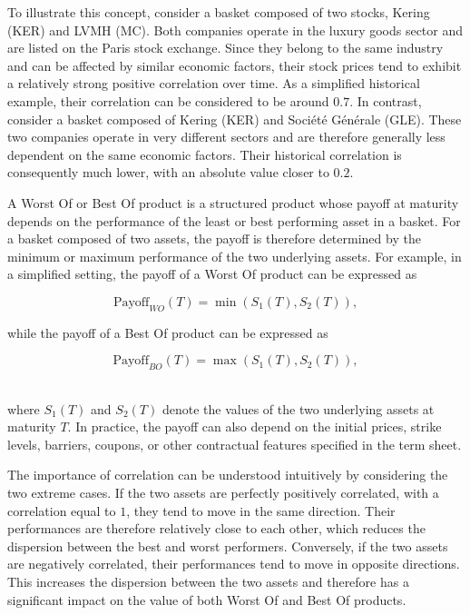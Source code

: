 \documentclass{article}
\begin{document}
To illustrate this concept, consider a basket composed of two stocks, Kering (KER) and LVMH (MC). Both companies operate in the luxury goods sector and are listed on the Paris stock exchange. Since they belong to the same industry and can be affected by similar economic factors, their stock prices tend to exhibit a relatively strong positive correlation over time. As a simplified historical example, their correlation can be considered to be around $0.7$. In contrast, consider a basket composed of Kering (KER) and Société Générale (GLE). These two companies operate in very different sectors and are therefore generally less dependent on the same economic factors. Their historical correlation is consequently much lower, with an absolute value closer to $0.2$.

A Worst Of or Best Of product is a structured product whose payoff at maturity depends on the performance of the least or best performing asset in a basket. For a basket composed of two assets, the payoff is therefore determined by the minimum or maximum performance of the two underlying assets. For example, in a simplified setting, the payoff of a Worst Of product can be expressed as

\begin{equation}
\text{Payoff}_{WO}(T)
=
\min\left(S_1(T),S_2(T)\right),
\end{equation}

while the payoff of a Best Of product can be expressed as

\begin{equation}
\text{Payoff}_{BO}(T)
=
\max\left(S_1(T),S_2(T)\right),
\end{equation}

\\

where $S_1(T)$ and $S_2(T)$ denote the values of the two underlying assets at maturity $T$. In practice, the payoff can also depend on the initial prices, strike levels, barriers, coupons, or other contractual features specified in the term sheet.

The importance of correlation can be understood intuitively by considering the two extreme cases. If the two assets are perfectly positively correlated, with a correlation equal to $1$, they tend to move in the same direction. Their performances are therefore relatively close to each other, which reduces the dispersion between the best and worst performers. Conversely, if the two assets are negatively correlated, their performances tend to move in opposite directions. This increases the dispersion between the two assets and therefore has a significant impact on the value of both Worst Of and Best Of products.
\end{document}
